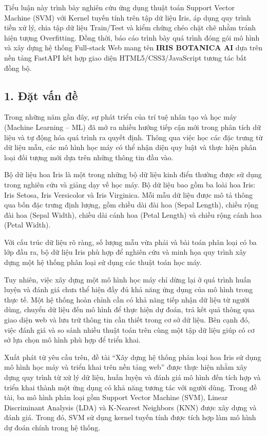 \documentclass[14pt]{extarticle}
\begin{document}
	\noindent  Tiểu luận này trình bày nghiên cứu ứng dụng thuật toán Support Vector Machine (SVM) với Kernel tuyến tính trên tập dữ liệu Iris, áp dụng quy trình tiền xử lý, chia tập dữ liệu Train/Test và kiểm chứng chéo chặt chẽ nhằm tránh hiện tượng Overfitting. Đồng thời, báo cáo trình bày quá trình đóng gói mô hình và xây dựng hệ thống Full-stack Web mang tên \textbf{IRIS BOTANICA AI} dựa trên nền tảng FastAPI kết hợp giao diện HTML5/CSS3/JavaScript tương tác bất đồng bộ.
	
\subsection*{1. Đặt vấn đề}

\noindent Trong những năm gần đây, sự phát triển của trí tuệ nhân tạo và học máy (Machine Learning -- ML) đã mở ra nhiều hướng tiếp cận mới trong phân tích dữ liệu và tự động hóa quá trình ra quyết định. Thông qua việc học các đặc trưng từ dữ liệu mẫu, các mô hình học máy có thể nhận diện quy luật và thực hiện phân loại đối tượng mới dựa trên những thông tin đầu vào.

\noindent Bộ dữ liệu hoa Iris là một trong những bộ dữ liệu kinh điển thường được sử dụng trong nghiên cứu và giảng dạy về học máy. Bộ dữ liệu bao gồm ba loài hoa Iris: Iris Setosa, Iris Versicolor và Iris Virginica. Mỗi mẫu dữ liệu được mô tả thông qua bốn đặc trưng định lượng, gồm chiều dài đài hoa (Sepal Length), chiều rộng đài hoa (Sepal Width), chiều dài cánh hoa (Petal Length) và chiều rộng cánh hoa (Petal Width).

\noindent Với cấu trúc dữ liệu rõ ràng, số lượng mẫu vừa phải và bài toán phân loại có ba lớp đầu ra, bộ dữ liệu Iris phù hợp để nghiên cứu và minh họa quy trình xây dựng một hệ thống phân loại sử dụng các thuật toán học máy.

\noindent Tuy nhiên, việc xây dựng một mô hình học máy chỉ dừng lại ở quá trình huấn luyện và đánh giá chưa thể hiện đầy đủ khả năng ứng dụng của mô hình trong thực tế. Một hệ thống hoàn chỉnh cần có khả năng tiếp nhận dữ liệu từ người dùng, chuyển dữ liệu đến mô hình để thực hiện dự đoán, trả kết quả thông qua giao diện web và lưu trữ thông tin cần thiết trong cơ sở dữ liệu. Bên cạnh đó, việc đánh giá và so sánh nhiều thuật toán trên cùng một tập dữ liệu giúp có cơ sở lựa chọn mô hình phù hợp để triển khai.

\noindent Xuất phát từ yêu cầu trên, đề tài ``Xây dựng hệ thống phân loại hoa Iris sử dụng mô hình học máy và triển khai trên nền tảng web'' được thực hiện nhằm xây dựng quy trình từ xử lý dữ liệu, huấn luyện và đánh giá mô hình đến tích hợp và triển khai thành một ứng dụng có khả năng tương tác với người dùng. Trong đề tài, ba mô hình phân loại gồm Support Vector Machine (SVM), Linear Discriminant Analysis (LDA) và K-Nearest Neighbors (KNN) được xây dựng và đánh giá. Trong đó, SVM sử dụng kernel tuyến tính được tích hợp làm mô hình dự đoán chính trong hệ thống.
\end{document}
